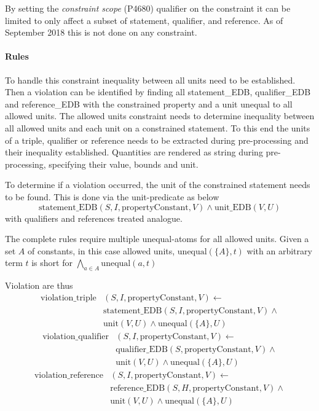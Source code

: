 \documentclass[hyperref,bachelorofscience,fleqn]{cgvpub}
\begin{document}
By setting the \emph{constraint scope} (P4680) qualifier on the constraint it can be limited to only affect a subset of statement, qualifier, and reference. As of September 2018 this is not done on any constraint.

\paragraph{Rules}
To handle this constraint inequality between all units need to be established. Then a violation can be identified by finding all statement\_EDB, qualifier\_EDB and reference\_EDB with the constrained property and a unit unequal to all allowed units.
The allowed units constraint needs to determine inequality between all allowed units and each unit on a constrained statement. To this end the units of a triple, qualifier or reference needs to be extracted during pre-processing and their inequality established. Quantities are rendered as string during pre-processing, specifying their value, bounds and unit.

To determine if a violation occurred, the unit of the constrained statement needs to be found. This is done via the unit-predicate as below
\begin{equation*}
\text{statement\_EDB}(S, I, \text{propertyConstant}, V) \wedge \text{unit\_EDB}(V, U)
\end{equation*}
with qualifiers and references treated analogue.

The complete rules require multiple unequal-atoms for all allowed units. Given a set \(A\) of constants, in this case allowed units, \(\text{unequal}(\{A\}, t)\) with an arbitrary term \(t\) is short for \(\bigwedge_{a \in A} \text{unequal}(a, t)\)

Violation are thus
\begin{equation*}
\begin{split}
\text{violation\_triple}&(S, I, \text{propertyConstant}, V) \leftarrow \\
&\text{statement\_EDB}(S, I, \text{propertyConstant}, V) \wedge{} \\
&\text{unit}(V, U) \wedge \text{unequal}(\{A\}, U)
\end{split}
\end{equation*}
\begin{equation*}
\begin{split}
\text{violation\_qualifier}&(S, I, \text{propertyConstant}, V) \leftarrow \\
&\text{qualifier\_EDB}(S, \text{propertyConstant}, V) \wedge{} \\
&\text{unit}(V, U) \wedge \text{unequal}(\{A\}, U)
\end{split}
\end{equation*}
\begin{equation*}
\begin{split}
\text{violation\_reference}&(S, I, \text{propertyConstant}, V) \leftarrow \\
&\text{reference\_EDB}(S, H, \text{propertyConstant}, V) \wedge{} \\
&\text{unit}(V, U) \wedge \text{unequal}(\{A\}, U)
\end{split}
\end{equation*}
\end{document}
